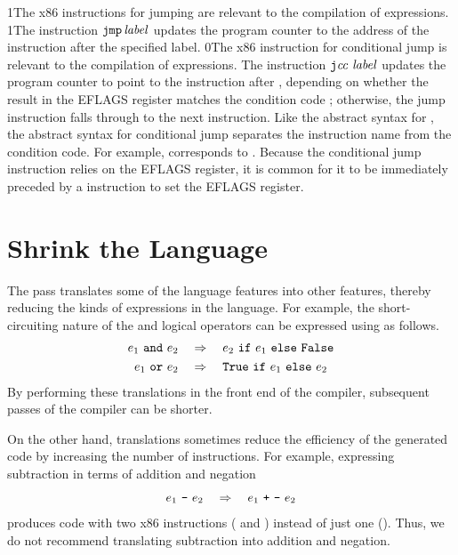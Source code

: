 \documentclass[7x10]{TimesAPriori_MIT}%
\def\racketEd{0}
\def\pythonEd{1}
\def\edition{1}
\newcommand{\racket}[1]{{\if\edition\racketEd{#1}\fi}}
\newcommand{\pythonColor}[0]{}
\newcommand{\python}[1]{{\if\edition\pythonEd\pythonColor #1\fi}}
\numberwithin{theorem}{chapter}
\numberwithin{definition}{chapter}
\numberwithin{equation}{chapter}
\begin{document}
\python{The x86 instructions for jumping are relevant to the
  compilation of \key{if} expressions.}
%
\python{The instruction $\key{jmp}\,\itm{label}$ updates the program
  counter to the address of the instruction after the specified
  label.}
%
\racket{The x86 instruction for conditional jump is relevant to the
  compilation of \key{if} expressions.}
%
The instruction $\key{j}\itm{cc}~\itm{label}$ updates the program
counter to point to the instruction after , depending on
whether the result in the EFLAGS register matches the condition code
; otherwise, the jump instruction falls through to the next
instruction.  Like the abstract syntax for , the abstract
syntax for conditional jump separates the instruction name from the
condition code. For example, 
corresponds to .  Because the conditional jump instruction
relies on the EFLAGS register, it is common for it to be immediately preceded by
a  instruction to set the EFLAGS register.


\section{Shrink the \LangIf{} Language}
\label{sec:shrink-Lif}

The  pass translates some of the language features into
other features, thereby reducing the kinds of expressions in the
language. For example, the short-circuiting nature of the 
and  logical operators can be expressed using  as
follows.
\begin{align*}
  \CAND{e_1}{e_2} & \quad \Rightarrow \quad \CIF{e_1}{e_2}{\FALSE{}}\\
  \COR{e_1}{e_2} & \quad \Rightarrow \quad \CIF{e_1}{\TRUE{}}{e_2}
\end{align*}
By performing these translations in the front end of the compiler,
subsequent passes of the compiler can be shorter.

On the other hand, translations sometimes reduce the efficiency of the
generated code by increasing the number of instructions. For example,
expressing subtraction in terms of addition and negation
\[
\CBINOP{\key{-}}{e_1}{e_2} \quad \Rightarrow \quad
  \CBINOP{\key{+}}{e_1}{ \CUNIOP{\key{-}}{e_2} }
\]
produces code with two x86 instructions ( and )
instead of just one (). Thus, we do not recommend
translating subtraction into addition and negation.
\end{document}
